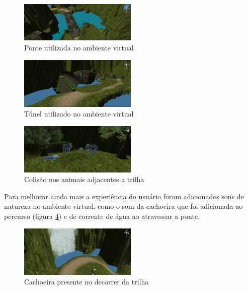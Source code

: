 \begin{figure}[h]
  \centering
  \includegraphics[width=0.5\textwidth]{figuras/bridgePosition}
  \caption{Ponte utilizada no ambiente virtual}
  \label{fig:bridgePosition}
\end{figure}

\begin{figure}[h]
  \centering
  \includegraphics[width=0.5\textwidth]{figuras/newTunnel}
  \caption{Túnel utilizado no ambiente virtual}
  \label{fig:newTunnel}
\end{figure}

\begin{figure}[h]
  \centering
  \includegraphics[width=0.5\textwidth]{figuras/animalsCollider}
  \caption{Colisão nos animais adjacentes a trilha}
  \label{fig:animalsCollider}
\end{figure}

Para melhorar ainda mais a experiência do usuário foram adicionados sons de natureza no ambiente virtual, como o som da cachoeira que foi adicionada ao percurso (figura \ref{fig:waterFallPosition}) e de corrente de água ao atravessar a ponte.

\begin{figure}[h]
  \centering
  \includegraphics[width=0.5\textwidth]{figuras/waterFallPosition}
  \caption{Cachoeira presente no decorrer da trilha}
  \label{fig:waterFallPosition}
\end{figure}

